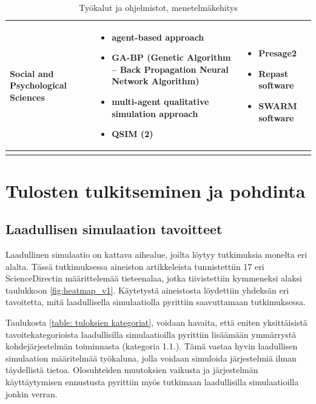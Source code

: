 \documentclass[utf8]{gradu3}
\begin{document}
\begin{longtable}[h]{|p{4cm}|p{6cm}|p{5cm}|}
    \\
    \hline
        Social and Psychological Sciences & \begin{itemize}
        \item agent-based approach
        \item GA-BP (Genetic Algorithm – Back Propagation Neural Network Algorithm)
        \item multi-agent qualitative simulation approach
        \item QSIM (2)
    \end{itemize} &
    \begin{itemize}
        \item Presage2
        \item Repast software
        \item SWARM software
    \end{itemize}
    \\
    \hline
    \caption{Työkalut ja ohjelmistot, menetelmäkehitys}
    \label{table:mallintaminen 3.}
\end{longtable}

\chapter{Tulosten tulkitseminen ja pohdinta} \label{tulkitseminen ja pohdinta}

\section{Laadullisen simulaation tavoitteet} \label{tulokset: simulaation tavoitteet}
Laadullinen simulaatio on kattava aihealue, joilta löytyy tutkimuksia monelta eri alalta.
Tässä tutkimuksessa aineiston artikkeleista tunnistettiin 17 
eri ScienceDirectin määrittelemää tieteenalaa, 
jotka tiivistettiin kymmeneksi alaksi taulukkoon 
\ref{fig:heatmap_v1}.
Käytetystä aineistosta löydettiin yhdeksän eri tavoitetta, 
mitä laadullisella simulaatiolla pyrittiin saavuttamaan tutkimuksessa.

Taulukosta \ref{table: tuloksien kategoriat}, voidaan havaita, 
että eniten yksittäisistä tavoitekategorioista 
laadullisilla simulaatioilla pyrittiin lisäämään 
ymmärrystä kohdejärjestelmän toiminnasta (kategoria 1.1.). 
Tämä vastaa hyvin laadullisen simulaation määritelmää
työkaluna, jolla voidaan simuloida järjestelmiä ilman täydellistä tietoa.
Olosuhteiden muutoksien vaikusta ja järjestelmän käyttäytymisen ennustusta
pyrittiin myös tutkimaan laadullisilla simulaatioilla jonkin verran.
\end{document}

